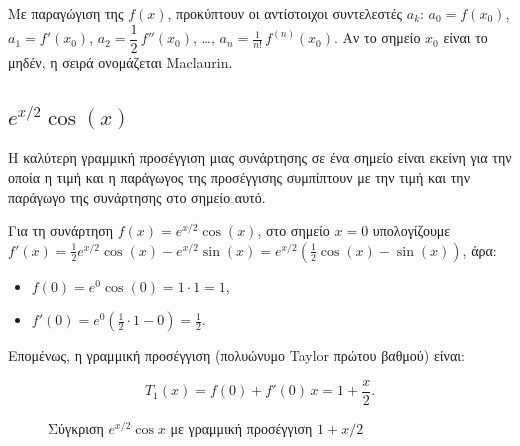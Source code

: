 \documentclass[a4paper, 11pt]{article}
\begin{document}
Με παραγώγιση της \(f(x)\), προκύπτουν οι αντίστοιχοι συντελεστές
\(a_k\): \(a_0 = f(x_0)\), \(a_1 = f'(x_0)\),
\(a_2 = \dfrac{1}{2}\,f''(x_0)\), \ldots,
\(a_n = \frac{1}{n!}\,f^{(n)}(x_0)\). Αν το σημείο \(x_0\) είναι το
μηδέν, η σειρά ονομάζεται Maclaurin.

\subsection{\texorpdfstring{\(e^{x/2}\cos(x)\)}{e\^{}\{x/2\}\textbackslash cos(x)}}\label{ex2cosx}

Η καλύτερη γραμμική προσέγγιση μιας συνάρτησης σε ένα σημείο είναι
εκείνη για την οποία η τιμή και η παράγωγος της προσέγγισης συμπίπτουν
με την τιμή και την παράγωγο της συνάρτησης στο σημείο αυτό.

Για τη συνάρτηση \(f(x) = e^{x/2} \cos(x)\), στο σημείο \(x = 0\)
υπολογίζουμε
\(f'(x) = \frac{1}{2} e^{x/2} \cos(x) - e^{x/2} \sin(x) = e^{x/2} \left( \frac{1}{2} \cos(x) - \sin(x) \right)\),
άρα:

\begin{itemize}
\item
  \(f(0) = e^{0} \cos(0) = 1 \cdot 1 = 1\),
\item
  \(f'(0) = e^{0} \left( \frac{1}{2} \cdot 1 - 0 \right) = \frac{1}{2}\).
\end{itemize}

Επομένως, η γραμμική προσέγγιση (πολυώνυμο Taylor πρώτου βαθμού) είναι:

\[
\boxed{T_1(x) = f(0) + f'(0) \, x = 1 + \frac{x}{2}}.
\]

\begin{figure}[htbp]
\centering
{}
\caption{Σύγκριση $e^{x/2}\cos x$ με γραμμική προσέγγιση $1+x/2$}
\label{fig:expcoslinear}
\end{figure}
\end{document}
